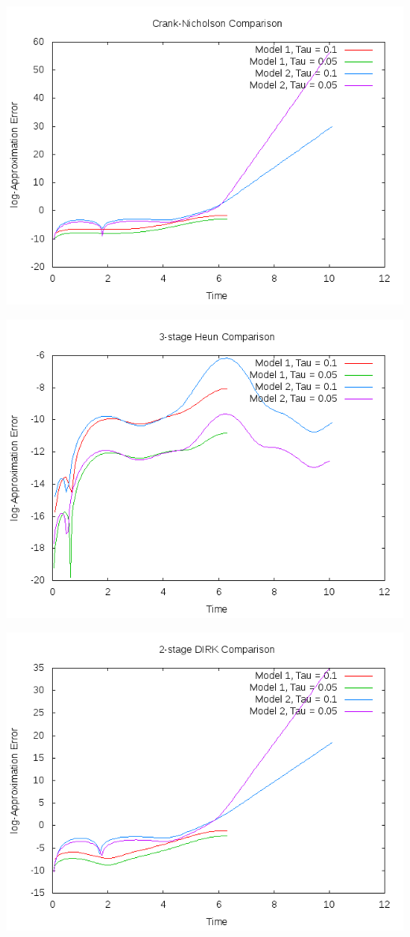 \documentclass[letterpaper,12pt]{article}
\begin{document}
\centerline{\includegraphics[scale = 0.5]{CN.png}}

\centerline{\includegraphics[scale = 0.5]{Heun3.png}}

\centerline{\includegraphics[scale = 0.5]{2DIRK.png}}
\end{document}
